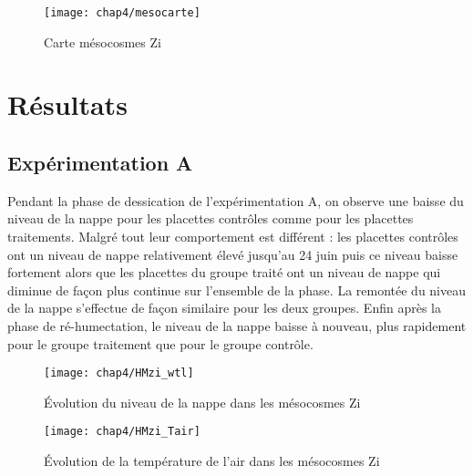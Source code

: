 \begin{figure}
\centering
\texttt{[image: chap4/mesocarte]}
\caption{Carte mésocosmes Zi}
\label{fig:mesocarte}
\end{figure}


\section{Résultats}

\subsection{Expérimentation A}

Pendant la phase de dessication de l'expérimentation A, on observe une baisse du niveau de la nappe pour les placettes contrôles comme pour les placettes traitements.
Malgré tout leur comportement est différent : les placettes contrôles ont un niveau de nappe relativement élevé jusqu'au 24 juin puis ce niveau baisse fortement alors que les placettes du groupe traité ont un niveau de nappe qui diminue de façon plus continue sur l'ensemble de la phase.
La remontée du niveau de la nappe s'effectue de façon similaire pour les deux groupes.
Enfin après la phase de ré-humectation, le niveau de la nappe baisse à nouveau, plus rapidement pour le groupe traitement que pour le groupe contrôle.


\begin{figure}
\centering
\texttt{[image: chap4/HMzi\_wtl]}
\caption{Évolution du niveau de la nappe dans les mésocosmes Zi}
\label{fig:HMzi_wtl}
\end{figure}


\begin{figure}
\centering
\texttt{[image: chap4/HMzi\_Tair]}
\caption{Évolution de la température de l'air dans les mésocosmes Zi}
\label{fig:HMzi_Tair}
\end{figure}

